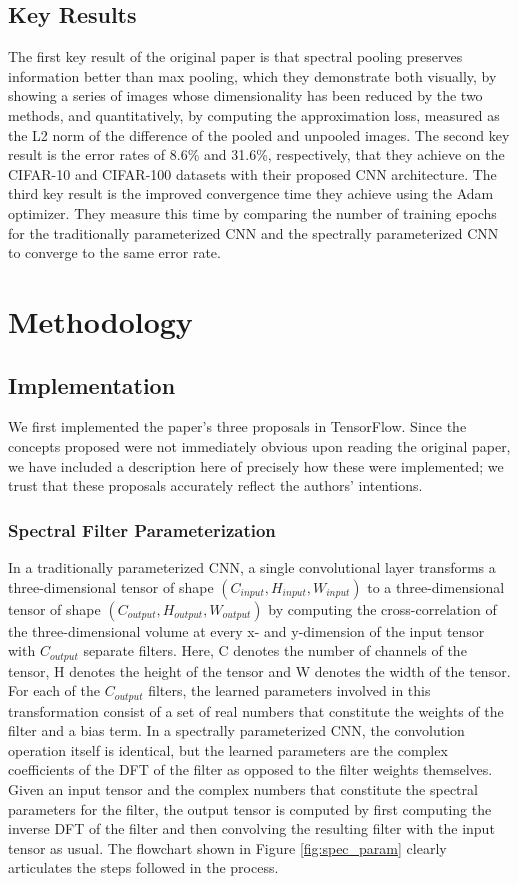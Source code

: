 \documentclass[10pt,journal,compsoc]{IEEEtran}
\begin{document}
\subsection{Key Results}
The first key result of the original paper is that spectral pooling preserves information better than max pooling, which they demonstrate both visually, by showing a series of images whose dimensionality has been reduced by the two methods, and quantitatively, by computing the approximation loss, measured as the L2 norm of the difference of the pooled and unpooled images. The second key result is the error rates of 8.6\% and 31.6\%, respectively, that they achieve on the CIFAR-10 and CIFAR-100 datasets with their proposed CNN architecture. The third key result is the improved convergence time they achieve using the Adam optimizer. They measure this time by comparing the number of training epochs for the traditionally parameterized CNN and the spectrally parameterized CNN to converge to the same error rate.

\section{Methodology}

\subsection{Implementation}
We first implemented the paper's three proposals in TensorFlow. Since the concepts proposed were not immediately obvious upon reading the original paper, we have included a description here of precisely how these were implemented; we trust that these proposals accurately reflect the authors' intentions.

\subsubsection{Spectral Filter Parameterization} \label{ssec:spec_conv_layer}
In a traditionally parameterized CNN, a single convolutional layer transforms a three-dimensional tensor of shape $(C_{input}, H_{input}, W_{input})$ to a three-dimensional tensor of shape
$(C_{output}, H_{output}, W_{output})$ by computing the cross-correlation of the three-dimensional volume at every x- and y-dimension of the input tensor with $C_{output}$ separate filters. Here, C denotes the number of channels of the tensor, H denotes the height of the tensor and W denotes the width of the tensor. For each of the $C_{output}$ filters, the learned parameters involved in this transformation consist of a set of real numbers that constitute the weights of the filter and a bias term. In a spectrally parameterized CNN, the convolution operation itself is identical, but the learned parameters are the complex coefficients of the DFT of the filter as opposed to the filter weights themselves. Given an input tensor and the complex numbers that constitute the spectral parameters for the filter, the output tensor is computed by first computing the inverse DFT of the filter and then convolving the resulting filter with the input tensor as usual. The flowchart shown in Figure \ref{fig:spec_param} clearly articulates the steps followed in the process.
\end{document}
